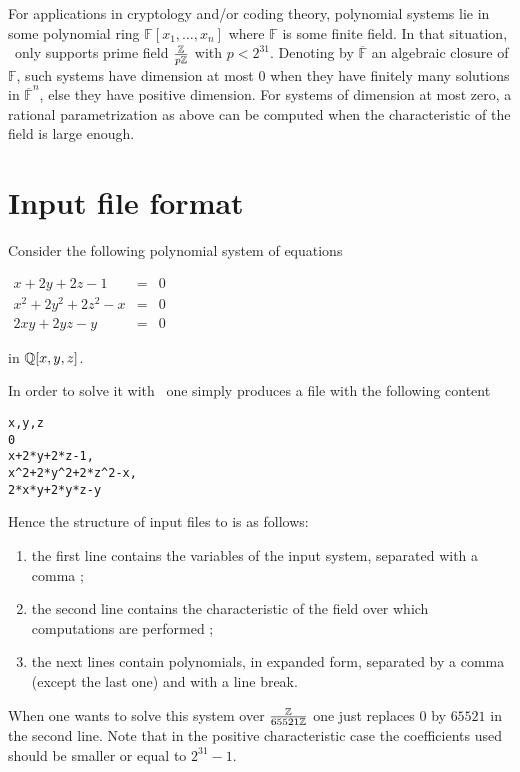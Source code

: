 \documentclass[a4paper,english,11pt]{scrartcl}
\theoremstyle{definition}
\theoremstyle{remark}
\newcommand{\bF}{{\mathbb{F}}}
\begin{document}
For applications in cryptology and/or coding theory, polynomial systems lie in
some polynomial ring $\bF[x_1, \ldots, x_n]$ where $\bF$ is some finite field. In
that situation, \msolve~only supports prime field $\frac{\mathbb{Z}}{p\mathbb{Z}}$ with $p <
2^{31}$. Denoting by $\overline{\bF}$ an algebraic closure of $\bF$, such systems
have dimension at most $0$ when they have finitely many solutions in
$\overline{\bF}^n$, else they have positive dimension. For systems of dimension
at most zero, a rational parametrization as above can be computed when the
characteristic of the field is large enough. 

\section{Input file format}

Consider the following polynomial system of equations
\begin{center}
$
\begin{array}{rcl}
x+2y+2z-1 &= &0\\
x^2+2y^2+2z^2-x &= &0\\
2xy+2yz-y &= &0
\end{array}
$
\end{center}
in $\mathbb{Q}[x,y,z]$.

In order to solve it with \msolve~one simply produces a file with the following content
\begin{tcolorbox}
\begin{verbatim}
x,y,z
0
x+2*y+2*z-1,
x^2+2*y^2+2*z^2-x,
2*x*y+2*y*z-y
\end{verbatim}  
\end{tcolorbox}
Hence the structure of input files to \msolve is as follows:
\begin{enumerate}
\item the first line contains the variables of the input system, separated with
  a comma ; 
\item the second line contains the characteristic of the field over which
  computations are performed ; 
\item the next lines contain polynomials, in expanded form, separated by a comma
  (except the last one) and with a line break. 
\end{enumerate}



When one wants to solve this system over $\frac{\mathbb{Z}}{65521\mathbb{Z}}$ one just replaces
$0$ by $65521$ in the second line. Note that in the positive characteristic case
the coefficients used should be smaller or equal to $2^{31}-1$.
\end{document}
